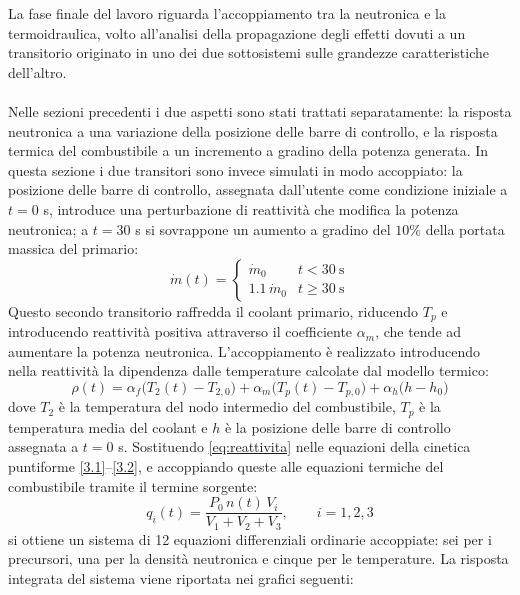 \documentclass[12pt]{report}
\begin{document}
La fase finale del lavoro riguarda l'accoppiamento tra la neutronica e la termoidraulica, volto all'analisi della propagazione degli effetti dovuti a un transitorio originato in uno dei due sottosistemi sulle grandezze caratteristiche dell'altro.\\ \\Nelle sezioni precedenti i due aspetti sono stati trattati separatamente: la risposta neutronica a una variazione della posizione delle barre di controllo, e la risposta termica del combustibile a un incremento a gradino della potenza generata. In questa sezione i due transitori sono invece simulati in modo accoppiato: la posizione delle barre di controllo, assegnata dall'utente come condizione iniziale a $t = 0$ s, introduce una perturbazione di reattività che modifica la potenza neutronica; a $t = 30$ s si sovrappone un aumento a gradino del $10\%$ della portata massica del primario:
\begin{equation}
    \dot{m}(t) =
    \begin{cases}
        \dot{m}_0        & t < 30\ \si{\second} \\
        1.1\,\dot{m}_0  & t \geq 30\ \si{\second}
    \end{cases}
\end{equation}
Questo secondo transitorio raffredda il coolant primario, riducendo $T_p$ e introducendo reattività positiva attraverso il coefficiente $\alpha_m$, che tende ad aumentare la potenza neutronica. L'accoppiamento è realizzato introducendo nella reattività la dipendenza dalle temperature calcolate dal modello termico:
\begin{equation}
    \rho(t) = \alpha_f\bigl(T_2(t) - T_{2,0}\bigr)
            + \alpha_m\bigl(T_p(t) - T_{p,0}\bigr)
            + \alpha_h\bigl(h - h_0\bigr)
    \label{eq:reattivita}
\end{equation}
dove $T_2$ è la temperatura del nodo intermedio del combustibile, $T_p$ è la temperatura media del coolant e $h$ è la posizione delle barre di controllo assegnata a $t = 0$ s. Sostituendo \eqref{eq:reattivita} nelle equazioni della cinetica puntiforme \eqref{3.1}--\eqref{3.2}, e accoppiando queste alle equazioni termiche del combustibile tramite il termine sorgente:
\begin{equation}
    q_i(t) = \frac{P_0\,n(t)\,V_i}{V_1+V_2+V_3}, \qquad i=1,2,3
\end{equation}
si ottiene un sistema di 12 equazioni differenziali ordinarie accoppiate: sei per i precursori, una per la densità neutronica e cinque per le temperature. La risposta integrata del sistema viene riportata nei grafici seguenti:
\end{document}

